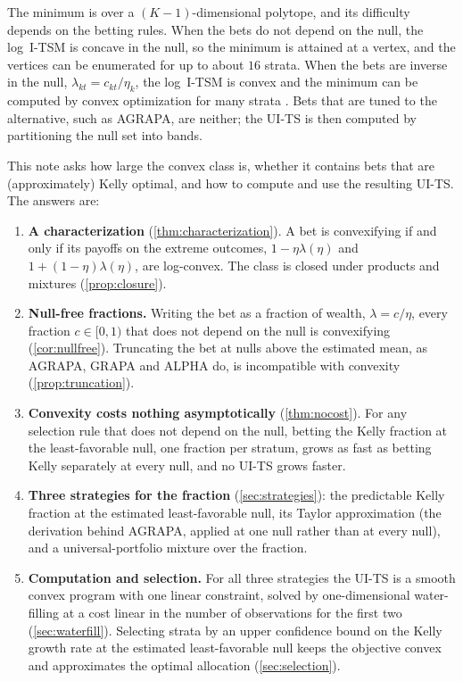 \documentclass[11pt]{article}
\theoremstyle{plain}
\theoremstyle{definition}
\theoremstyle{remark}
\begin{document}
The minimum is over a $(K-1)$-dimensional polytope, and its difficulty depends on the betting rules.  When the bets
do not depend on the null, the log~I-TSM is concave in the null, so the minimum is attained at a vertex, and the
vertices can be enumerated for up to about $16$ strata.  When the bets are inverse in the null,
$\lambda_{kt} = c_{kt}/\eta_k$, the log~I-TSM is convex and the minimum can be computed by convex optimization for
many strata \citep[Section 5]{spertus2024sequential}.  Bets that are tuned to the alternative, such as AGRAPA, are
neither; the UI-TS is then computed by partitioning the null set into bands.

This note asks how large the convex class is, whether it contains bets that are (approximately) Kelly optimal, and
how to compute and use the resulting UI-TS.  The answers are:

\begin{enumerate}
  \item \textbf{A characterization} (\cref{thm:characterization}).  A bet is convexifying if and only if its payoffs
  on the extreme outcomes, $1-\eta\lambda(\eta)$ and $1+(1-\eta)\lambda(\eta)$, are log-convex.  The class is closed under
  products and mixtures (\cref{prop:closure}).
  \item \textbf{Null-free fractions.}  Writing the bet as a fraction of wealth, $\lambda=c/\eta$, every fraction
  $c\in[0,1)$ that does not depend on the null is convexifying (\cref{cor:nullfree}).  Truncating the bet at nulls above
  the estimated mean, as AGRAPA, GRAPA and ALPHA do, is incompatible with convexity (\cref{prop:truncation}).
  \item \textbf{Convexity costs nothing asymptotically} (\cref{thm:nocost}).  For any selection rule that does not depend
  on the null, betting the Kelly fraction at the least-favorable null, one fraction per stratum, grows as fast as
  betting Kelly separately at every null, and no UI-TS grows faster.
  \item \textbf{Three strategies for the fraction} (\cref{sec:strategies}): the predictable Kelly fraction at the
  estimated least-favorable null, its Taylor approximation (the derivation behind AGRAPA, applied at one null rather
  than at every null), and a universal-portfolio mixture over the fraction.
  \item \textbf{Computation and selection.}  For all three strategies the UI-TS is a smooth convex program with one
  linear constraint, solved by one-dimensional water-filling at a cost linear in the number of observations for the
  first two (\cref{sec:waterfill}).  Selecting strata by an upper confidence bound on the Kelly growth rate at the estimated
  least-favorable null keeps the objective convex and approximates the optimal allocation (\cref{sec:selection}).
\end{enumerate}
\end{document}

